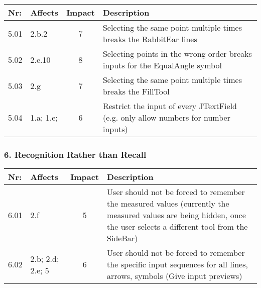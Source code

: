         \begin{tabular}{l | p{} | c | p{}}
        Nr: & Affects & Impact & Description \\ \hline
        5.01 & 2.b.2 & 7 & Selecting the same point multiple times breaks the RabbitEar lines \\ \hline
        5.02 & 2.e.10  & 8 & Selecting points in the wrong order breaks inputs for the EqualAngle symbol \\ \hline 
        5.03 & 2.g & 7 & Selecting the same point multiple times breaks the FillTool \\ \hline
        5.04 & 1.a; 1.e; & 6 & Restrict the input of every JTextField (e.g. only allow numbers for number inputs)\\ \hline
        \end{tabular}

\subsubsection*{6. Recognition Rather than Recall}

        \begin{tabular}{l | p{} | c | p{}}
        Nr: & Affects & Impact & Description \\ \hline
        6.01 & 2.f  & 5 & User should not be forced to remember the measured values (currently the measured values are being hidden, once the user selects a different tool from the SideBar)\\ \hline
        6.02 & 2.b; 2.d; 2.e; 5  & 6 & User should not be forced to remember the specific input sequences for all lines, arrows, symbols (Give input previews)\\ \hline 
        \end{tabular}


